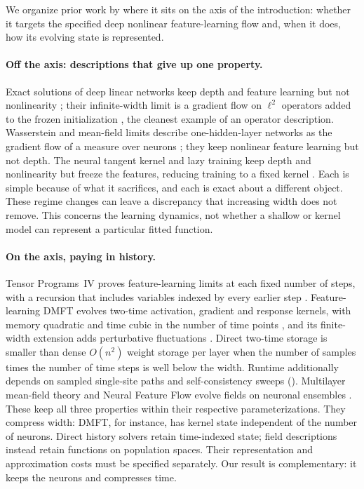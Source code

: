 \documentclass[11pt]{article}
\theoremstyle{definition}
\theoremstyle{remark}
\begin{document}
We organize prior work by where it sits on the axis of the introduction: whether
it targets the specified deep nonlinear feature-learning flow and, when it
does, how its evolving state is represented.

\paragraph{Off the axis: descriptions that give up one property.}
Exact solutions of deep linear networks keep depth and feature learning but not
nonlinearity \citep{saxe2014exact}; their infinite-width limit is a gradient
flow on $\ell^2$ operators added to the frozen initialization
\citep{chizat2024linear}, the cleanest example of an operator description.
Wasserstein and mean-field limits describe one-hidden-layer networks as the
gradient flow of a measure over neurons
\citep{chizat2018global,mei2018meanfield,sirignano2019lln}; they keep nonlinear
feature learning but not depth.  The neural tangent kernel and lazy training
keep depth and nonlinearity but freeze the features, reducing training to a
fixed kernel \citep{jacot2018ntk,lee2019wide,chizat2019lazy}.  Each is simple
because of what it sacrifices, and each is exact about a different object.
These regime changes can leave a discrepancy that increasing width does not
remove.  This concerns the learning dynamics, not whether a shallow or kernel
model can represent a particular fitted function.

\paragraph{On the axis, paying in history.}
Tensor Programs~IV proves feature-learning limits at each fixed number of steps,
with a recursion that includes variables indexed by every earlier step
\citep{yang2021tensor}.  Feature-learning DMFT evolves two-time activation,
gradient and response kernels, with memory quadratic and time cubic in the
number of time points \citep{bordelon2022dmft}, and its finite-width extension
adds perturbative fluctuations \citep{bordelon2023finite}.  Direct two-time
storage is smaller than dense $O(n^2)$ weight storage per layer when the
number of samples times the number of time steps is well below the width.  Runtime additionally depends on sampled
single-site paths and self-consistency sweeps ().
Multilayer mean-field theory and Neural Feature Flow evolve fields on neuronal
ensembles \citep{nguyen2023rigorous,fang2020features}.  These keep all three
properties within their respective parameterizations.  They compress width: DMFT, for
instance, has kernel state independent of the number of neurons.  Direct
history solvers retain time-indexed state; field descriptions instead retain
functions on population spaces.  Their representation and approximation
costs must be specified separately.
Our result is complementary: it keeps the neurons and compresses time.
\end{document}

